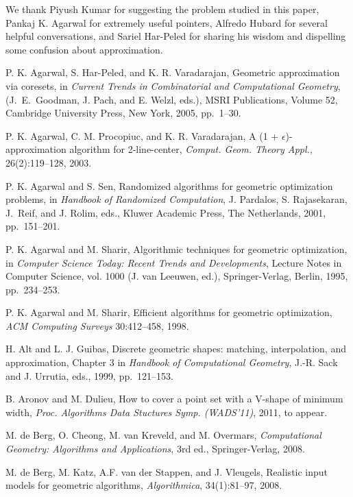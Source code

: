 \documentclass{llncs}
\begin{document}
We thank Piyush Kumar for suggesting the problem studied in this
paper, Pankaj K. Agarwal for extremely useful pointers, Alfredo Hubard
for several helpful conversations, and Sariel Har-Peled for sharing
his wisdom and dispelling some confusion about approximation.



\begin{thebibliography}{99}
P. K. Agarwal, S. Har-Peled, and K. R. Varadarajan,
Geometric approximation via coresets,
in
\emph{Current Trends in Combinatorial and Computational Geometry},
(J.~E.~Goodman, J. Pach, and E. Welzl, eds.), MSRI Publications,
Volume 52, Cambridge University Press, New York, 2005, pp.~1--30.

P. K. Agarwal, C. M. Procopiuc, and K. R. Varadarajan,
A (1 + $\epsilon$)-approximation algorithm for 2-line-center,
\emph{Comput. Geom. Theory Appl.}, 26(2):119--128, 2003. 
 
P. K. Agarwal and S. Sen,
Randomized algorithms for geometric optimization problems,
in
\emph{Handbook of Randomized Computation}, J. Pardalos,
S. Rajasekaran, J.~Reif, and J. Rolim, eds., Kluwer Academic Press,
The Netherlands, 2001, pp.~151--201.

P. K. Agarwal and M. Sharir,
Algorithmic techniques for geometric optimization,
in \emph{Computer Science Today: Recent Trends and Developments},
Lecture Notes in Computer Science, vol. 1000 (J. van Leeuwen, ed.),
Springer-Verlag, Berlin, 1995, pp.~234--253. 
	 
P. K. Agarwal and M. Sharir,
Efficient algorithms for geometric optimization,
\emph{ACM Computing Surveys} 30:412--458, 1998.
	
H. Alt and L. J. Guibas, 
Discrete geometric shapes: matching, interpolation, and approximation,
Chapter 3 in \emph{Handbook of Computational Geometry}, J.-R. Sack and
J. Urrutia, eds., 1999, pp.~121--153.

 B. Aronov and M. Dulieu, 
How to cover a point set with a V-shape of minimum width,
\emph{Proc. Algorithms Data Stuctures Symp. (WADS'11)}, 2011, to appear.

 M. de Berg, O. Cheong, M. van Kreveld, and M. Overmars, 
 \emph{Computational Geometry: Algorithms and Applications},
 3rd ed., Springer-Verlag, 2008.

M. de Berg, M. Katz, A.F. van der Stappen, and J. Vleugels, 
Realistic input models for geometric algorithms,
\emph{Algorithmica},
34(1):81--97, 2008.


\end{thebibliography}
\end{document}
